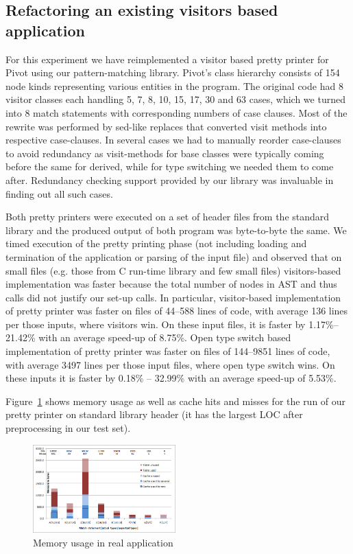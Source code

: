 \subsection{Refactoring an existing visitors based application}
\label{sec:qualcmp}

For this experiment we have reimplemented a visitor based \Cpp{} pretty printer for 
Pivot\cite{Pivot09} using our pattern-matching library. Pivot's class hierarchy 
consists of 154 node kinds representing various entities in the \Cpp{} program. The 
original code had 8 visitor classes each handling 5, 7, 8, 10, 15, 17, 30 and 63 
cases, which we turned into 8 match statements with corresponding numbers of 
case clauses. Most of the rewrite was performed by sed-like replaces that 
converted visit methods into respective case-clauses. In several cases we had to 
manually reorder case-clauses to avoid redundancy as visit-methods for base classes 
were typically coming before the same for derived, while for type switching we 
needed them to come after. Redundancy checking support provided by our library 
was invaluable in finding out all such cases.

Both pretty printers were executed on a set of header files from the \Cpp{} 
standard library and the produced output of both program was byte-to-byte the same. 
We timed execution of the pretty printing phase (not including loading and termination 
of the application or parsing of the input file) and observed that on small 
files (e.g. those from C run-time library and few small \Cpp{} files) 
visitors-based implementation was faster because the total number of nodes in 
AST and thus calls did not justify our set-up calls. In particular, 
visitor-based implementation of pretty printer was faster on files of 44--588  
lines of code, with average 136 lines per those inputs, where visitors win. On 
these input files, it is faster by 1.17\%--21.42\% with an average speed-up of 
8.75\%. Open type switch based implementation of pretty printer was faster on 
files of 144--9851 lines of code, with average 3497 lines per those input files, 
where open type switch wins. On these inputs it is faster by 0.18\% -- 32.99\% 
with an average speed-up of 5.53\%.

Figure~\ref{fig:mem} shows memory usage as well as cache hits and misses for 
the run of our pretty printer on  standard library 
header (it has the largest LOC after preprocessing in our test set).

\begin{figure}[htbp]
  \centering
    \includegraphics[width=0.49\textwidth]{Memory.png}
  \caption{Memory usage in real application}
  \label{fig:mem}
\end{figure}

